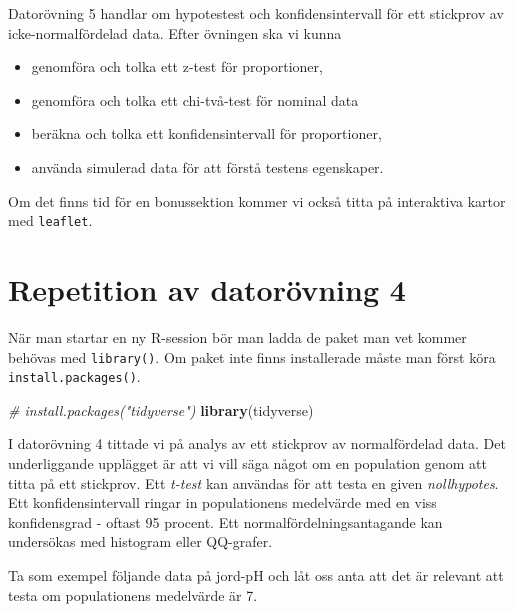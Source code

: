 \documentclass[
]{book}
\newenvironment{Shaded}{\begin{snugshade}}{\end{snugshade}}
\newcommand{\CommentTok}[1]{\textcolor[rgb]{0.56,0.35,0.01}{\textit{#1}}}
\newcommand{\FunctionTok}[1]{\textcolor[rgb]{0.13,0.29,0.53}{\textbf{#1}}}
\newcommand{\NormalTok}[1]{#1}
\theoremstyle{definition}
\theoremstyle{definition}
\theoremstyle{definition}
\theoremstyle{definition}
\theoremstyle{remark}
\begin{document}
Datorövning 5 handlar om hypotestest och konfidensintervall för ett stickprov av icke-normalfördelad data. Efter övningen ska vi kunna

\begin{itemize}
\item
  genomföra och tolka ett z-test för proportioner,
\item
  genomföra och tolka ett chi-två-test för nominal data
\item
  beräkna och tolka ett konfidensintervall för proportioner,
\item
  använda simulerad data för att förstå testens egenskaper.
\end{itemize}

Om det finns tid för en bonussektion kommer vi också titta på interaktiva kartor med \texttt{leaflet}.

\hypertarget{repetition-av-datoruxf6vning-4}{%
\section{Repetition av datorövning 4}\label{repetition-av-datoruxf6vning-4}}

När man startar en ny R-session bör man ladda de paket man vet kommer behövas med \texttt{library()}. Om paket inte finns installerade måste man först köra \texttt{install.packages()}.

\begin{Shaded}
\begin{Highlighting}[]
\CommentTok{\# install.packages("tidyverse")}
\FunctionTok{library}\NormalTok{(tidyverse)}
\end{Highlighting}
\end{Shaded}

I datorövning 4 tittade vi på analys av ett stickprov av normalfördelad data. Det underliggande upplägget är att vi vill säga något om en population genom att titta på ett stickprov. Ett \emph{t-test} kan användas för att testa en given \emph{nollhypotes}. Ett konfidensintervall ringar in populationens medelvärde med en viss konfidensgrad - oftast 95 procent. Ett normalfördelningsantagande kan undersökas med histogram eller QQ-grafer.

Ta som exempel följande data på jord-pH och låt oss anta att det är relevant att testa om populationens medelvärde är 7.
\end{document}
